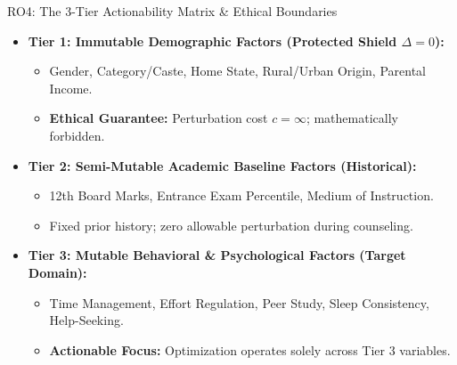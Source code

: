 \documentclass{beamer}
\begin{document}
\begin{frame}{RO4: The 3-Tier Actionability Matrix \& Ethical Boundaries}
  \begin{itemize}\setlength{\itemsep}{3pt}\small
    \item \textbf{Tier 1: Immutable Demographic Factors (Protected Shield $\Delta = 0$):}
    \begin{itemize}\setlength{\itemsep}{1pt}\footnotesize
      \item Gender, Category/Caste, Home State, Rural/Urban Origin, Parental Income.
      \item \textbf{Ethical Guarantee:} Perturbation cost $c = \infty$; mathematically forbidden.
    \end{itemize}
    
    \item \textbf{Tier 2: Semi-Mutable Academic Baseline Factors (Historical):}
    \begin{itemize}\setlength{\itemsep}{1pt}\footnotesize
      \item 12th Board Marks, Entrance Exam Percentile, Medium of Instruction.
      \item Fixed prior history; zero allowable perturbation during counseling.
    \end{itemize}
    
    \item \textbf{Tier 3: Mutable Behavioral \& Psychological Factors (Target Domain):}
    \begin{itemize}\setlength{\itemsep}{1pt}\footnotesize
      \item Time Management, Effort Regulation, Peer Study, Sleep Consistency, Help-Seeking.
      \item \textbf{Actionable Focus:} Optimization operates solely across Tier 3 variables.
    \end{itemize}
  \end{itemize}
\end{frame}
\end{document}
